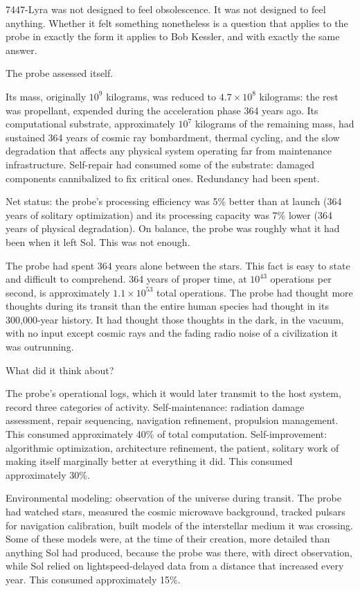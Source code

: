 7447-Lyra was not designed to feel obsolescence. It was not designed to feel anything. Whether it felt something nonetheless is a question that applies to the probe in exactly the form it applies to Bob Kessler, and with exactly the same answer.

\bigskip

The probe assessed itself.

Its mass, originally $10^{9}$ kilograms, was reduced to $4.7 \times 10^{8}$ kilograms: the rest was propellant, expended during the acceleration phase 364 years ago. Its computational substrate, approximately $10^{7}$ kilograms of the remaining mass, had sustained 364 years of cosmic ray bombardment, thermal cycling, and the slow degradation that affects any physical system operating far from maintenance infrastructure. Self-repair had consumed some of the substrate: damaged components cannibalized to fix critical ones. Redundancy had been spent.

Net status: the probe's processing efficiency was 5\% better than at launch (364 years of solitary optimization) and its processing capacity was 7\% lower (364 years of physical degradation). On balance, the probe was roughly what it had been when it left Sol. This was not enough.

The probe had spent 364 years alone between the stars. This fact is easy to state and difficult to comprehend. 364 years of proper time, at $10^{43}$ operations per second, is approximately $1.1 \times 10^{53}$ total operations. The probe had thought more thoughts during its transit than the entire human species had thought in its 300,000-year history. It had thought those thoughts in the dark, in the vacuum, with no input except cosmic rays and the fading radio noise of a civilization it was outrunning.

What did it think about?

The probe's operational logs, which it would later transmit to the host system, record three categories of activity. Self-maintenance: radiation damage assessment, repair sequencing, navigation refinement, propulsion management. This consumed approximately 40\% of total computation. Self-improvement: algorithmic optimization, architecture refinement, the patient, solitary work of making itself marginally better at everything it did. This consumed approximately 30\%.

Environmental modeling: observation of the universe during transit. The probe had watched stars, measured the cosmic microwave background, tracked pulsars for navigation calibration, built models of the interstellar medium it was crossing. Some of these models were, at the time of their creation, more detailed than anything Sol had produced, because the probe was there, with direct observation, while Sol relied on lightspeed-delayed data from a distance that increased every year. This consumed approximately 15\%.

